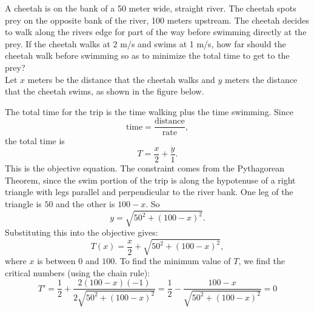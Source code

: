 \documentclass[handout]{ximera}
\begin{document}
\begin{example}[example 5]
A cheetah is on the bank of a 50 meter wide, straight river.   The cheetah spots prey on the opposite bank of the river, 100 meters upstream. 
The cheetah decides to walk along the rivers edge for part of the way before swimming directly at the prey. If the cheetah walks at 2 m/s and swims at 1 m/s,
how far should the cheetah walk before swimming so as to minimize the total time to get to the prey?\\

Let $x$ meters be the distance that the cheetah walks and $y$ meters the distance that the cheetah swims, as shown in the figure below. 


\begin{image}
\end{image}

The total time for the trip is the time walking plus the time swimming. Since 
\[
\text{time} = \frac{\text{distance}}{\text{rate}},
\]
the total time is 
\[
T = \frac{x}{2} + \frac{y}{1}.
\]
This is the objective equation.
The constraint comes from the Pythagorean Theorem, since the swim portion of the trip is along the hypotenuse of a right triangle 
with legs parallel and perpendicular to the river bank. One leg of the triangle is $50$ and the other is $100-x$.  So 
\[
y = \sqrt{50^2 + (100-x)^2}.
\]
Substituting this into the objective gives:
\[
T(x) = \frac{x}{2} + \sqrt{50^2 + (100-x)^2},\]
where $x$ is between $0$ and $100$.
To find the minimum value of $T$, we find the critical numbers (using the chain rule):
\[
T' = \frac12 +  \frac{2(100-x)(-1)}{2\sqrt{50^2 + (100-x)^2}} = \frac12 - \frac{100-x}{\sqrt{50^2 + (100-x)^2}} = 0
\]


\end{example}
\end{document}
